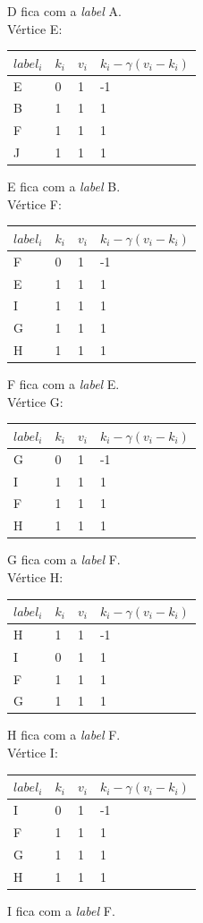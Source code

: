 \documentclass[a4paper,10pt]{report}
\begin{document}
  D fica com a \textit{label} A.
\\[0.25cm]
Vértice E:
  \begin{tabular}{| l | l | l | l |}
  \hline
  $label_i$ & $k_i$ & $v_i$ & $k_i - \gamma(v_i - k_i)$\\ \hline
  E & 0 & 1 & -1 \\ \hline
  B & 1 & 1 & 1  \\ \hline
  F & 1 & 1 & 1  \\ \hline
  J & 1 & 1 & 1  \\ \hline
  \end{tabular}  
  E fica com a \textit{label} B.
\\[0.25cm]
Vértice F:
  \begin{tabular}{| l | l | l | l |}
  \hline
  $label_i$ & $k_i$ & $v_i$ & $k_i - \gamma(v_i - k_i)$\\ \hline
  F & 0 & 1 & -1 \\ \hline
  E & 1 & 1 & 1  \\ \hline
  I & 1 & 1 & 1  \\ \hline
  G & 1 & 1 & 1  \\ \hline
  H & 1 & 1 & 1  \\ \hline
  \end{tabular}  
  F fica com a \textit{label} E.
\\[0.25cm]
Vértice G:
  \begin{tabular}{| l | l | l | l |}
  \hline
  $label_i$ & $k_i$ & $v_i$ & $k_i - \gamma(v_i - k_i)$\\ \hline
  G & 0 & 1 & -1  \\ \hline
  I & 1 & 1 & 1 \\ \hline
  F & 1 & 1 & 1  \\ \hline
  H & 1 & 1 & 1  \\ \hline
  \end{tabular}  
  G fica com a \textit{label} F.
\\[0.25cm]
Vértice H:
  \begin{tabular}{| l | l | l | l |}
  \hline
  $label_i$ & $k_i$ & $v_i$ & $k_i - \gamma(v_i - k_i)$\\ \hline
  H & 1 & 1 & -1  \\ \hline
  I & 0 & 1 & 1 \\ \hline
  F & 1 & 1 & 1  \\ \hline
  G & 1 & 1 & 1  \\ \hline
  \end{tabular}  
  H fica com a \textit{label} F.
\\[0.25cm]
Vértice I:
  \begin{tabular}{| l | l | l | l |}
  \hline
  $label_i$ & $k_i$ & $v_i$ & $k_i - \gamma(v_i - k_i)$\\ \hline
  I & 0 & 1 & -1 \\ \hline
  F & 1 & 1 & 1  \\ \hline
  G & 1 & 1 & 1  \\ \hline
  H & 1 & 1 & 1  \\ \hline
  \end{tabular}  
  I fica com a \textit{label} F.
\\[0.25cm]
  

  

  
\end{document}
